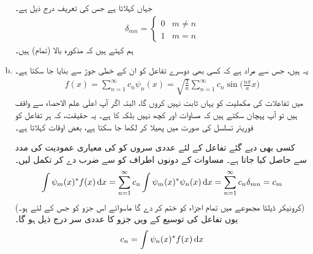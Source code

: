 \begin{enumerate}[a.]
جہاں   کہلاتا ہے  جس کی تعریف درج ذیل ہے۔ 
\begin{align}
\delta_{mn}=
\begin{cases}
0& m\neq n\\
1 & m=n
\end{cases}
\end{align} 
ہم کہتے ہیں کہ مذکورہ بالا (تمام)   ہیں۔ 
\item
 یہ  ہیں، جس سے مراد ہے کہ کسی بھی دوسرے تفاعل  کو ان کے خطی جوڑ سے بنایا جا سکتا ہے۔
\begin{align}\label{مساوات_شروڈنگر_کوئی_تفاعل}
f(x)=\sum_{n=1}^{\infty}c_{n}\psi_{n}(x)=\sqrt{\frac{2}{a}}\sum_{n=1}^{\infty}c_{n}\sin\big(\frac{n\pi}{a}x\big)
\end{align}
 میں تفاعلات  کی مکملیت کو یہاں ثابت نہیں کروں گا، البتہ اگر آپ  اعلٰی علم الاحصاء  سے واقف ہیں تو آپ پہچان سکتے ہیں کہ  مساوات   اور کچھ نہیں بلکہ   کا ہے۔ یہ حقیقت، کہ ہر تفاعل کو فوریئر تسلسل کی صورت میں پھیلا کر لکھا جا سکتا ہے، بعض اوقات  کہلاتا ہے۔

کسی بھی دیے گئے تفاعل  کے لئے عددی سروں  کو  کی معیاری عمودیت کی مدد سے حاصل کیا جاتا ہے۔ مساوات  کے دونوں اطراف کو  سے ضرب دے کر تکمل لیں۔
 \begin{align}
\int \psi_{m}(x)^*f(x)\dif{x}=\sum_{n=1}^{\infty}c_{n}\int\psi_{m}(x)^*\psi_{n}(x)\dif{x}=\sum_{n=1}^{\infty}c_{n}\delta_{mn}=c_{m}
\end{align}
(کرونیکر ڈیلٹا مجموعے میں تمام اجزاء کو ختم کر دے گا   ماسوائے اس جزو کو جس کے لئے  ہو۔) یوں تفاعل  کی توسیع  کے  ویں جزو کا عددی سر درج ذیل ہو گا۔
\begin{align}\label{مساوات_شروڈنگر_عددی_سر}
c_{n}=\int\psi_{n}(x)^*f(x)\dif{x}
\end{align}
\end{enumerate}

